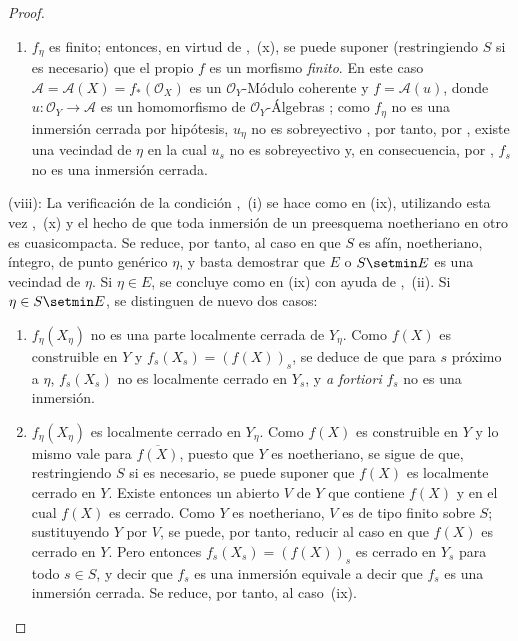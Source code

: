 \begin{proof}
\begin{enumerate}[label=\upshape{$\arabic{enumi}^\circ$}]
  \item $f_\eta$ es finito; entonces, en virtud de ,~(x), se puede suponer (restringiendo $S$ si es necesario) que el propio $f$ es un morfismo \emph{finito}.
  En este caso $\mathcal A=\mathcal A(X)=f_*(\mathcal O_X)$ es un $\mathcal O_Y$-Módulo coherente  y $f=\mathcal A(u)$, donde $u:\mathcal O_Y\to\mathcal A$ es un homomorfismo de $\mathcal O_Y$-Álgebras ; como $f_\eta$ no es una inmersión cerrada por hipótesis, $u_\eta$ no es sobreyectivo , por tanto, por , existe una vecindad de $\eta$ en la cual $u_s$ no es sobreyectivo y, en consecuencia, por , $f_s$ no es una inmersión cerrada.
\end{enumerate}

(viii): La verificación de la condición ,~(i) se hace como en (ix), utilizando esta vez ,~(x) y el hecho de que toda inmersión de un preesquema noetheriano en otro es cuasicompacta.
Se reduce, por tanto, al caso en que $S$ es afín, noetheriano, íntegro, de punto genérico $\eta$, y basta demostrar que $E$ o $S\setmin E$ es una vecindad de $\eta$.
Si $\eta\in E$, se concluye como en (ix) con ayuda de ,~(ii).
Si $\eta\in S\setmin E$, se distinguen de nuevo dos casos:
\begin{enumerate}[label=\upshape{$\arabic{enumi}^\circ$}]
  \item 
{}
$f_\eta(X_\eta)$ no es una parte localmente cerrada de $Y_\eta$.
  Como $f(X)$ es construible en $Y$  y $f_s(X_s)=(f(X))_s$, se deduce de  que para $s$ próximo a $\eta$, $f_s(X_s)$ no es localmente cerrado en $Y_s$, y \emph{a fortiori} $f_s$ no es una inmersión.

  \item $f_\eta(X_\eta)$ es localmente cerrado en $Y_\eta$.
  Como $f(X)$ es construible en $Y$  y lo mismo vale para $\overline{f(X)}$, puesto que $Y$ es noetheriano, se sigue de  que, restringiendo $S$ si es necesario, se puede suponer que $f(X)$ es localmente cerrado en $Y$.
  Existe entonces un abierto $V$ de $Y$ que contiene $f(X)$ y en el cual $f(X)$ es cerrado.
  Como $Y$ es noetheriano, $V$ es de tipo finito sobre $S$; sustituyendo $Y$ por $V$, se puede, por tanto, reducir al caso en que $f(X)$ es cerrado en $Y$.
  Pero entonces $f_s(X_s)=(f(X))_s$ es cerrado en $Y_s$ para todo $s\in S$, y decir que $f_s$ es una inmersión equivale a decir que $f_s$ es una inmersión cerrada.
  Se reduce, por tanto, al caso~(ix).
\end{enumerate}


\end{proof}
